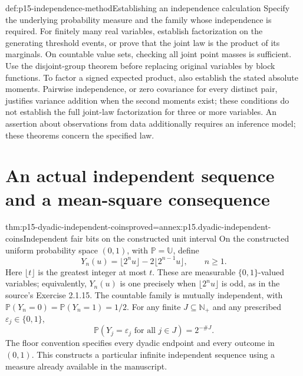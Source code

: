 \begin{hbmethod}{def:p15-independence-method}{Establishing an independence calculation}
Specify the underlying probability measure and the family whose
independence is required. For finitely many real variables, establish
factorization on the generating threshold events, or prove that the
joint law is the product of its marginals. On countable value sets,
checking all joint point masses is sufficient. Use the disjoint-group
theorem before replacing original variables by block functions. To factor
a signed expected product, also establish the stated absolute moments.
Pairwise independence, or zero covariance for every distinct pair,
justifies variance addition when the second moments exist; these
conditions do not establish the full joint-law factorization for three
or more variables. An assertion about observations from data additionally
requires an inference model; these theorems concern the specified law.
\end{hbmethod}

\section{An actual independent sequence and a mean-square consequence}
\label{sec:p15-independent-sequence}

\begin{hbtheorem}{thm:p15-dyadic-independent-coins}{proved=annex:p15.dyadic-independent-coins}{Independent fair bits on the constructed unit interval}
On the constructed uniform probability space \((0,1)\), with
\(\mathbb P=\mathbb U\), define
\[
 Y_n(u)=\lfloor2^nu\rfloor-2\lfloor2^{n-1}u\rfloor,
                      \qquad n\geq1.
\]
Here \(\lfloor t\rfloor\) is the greatest integer at most \(t\).
These are measurable \(\{0,1\}\)-valued variables; equivalently,
\(Y_n(u)\) is one precisely when \(\lfloor2^nu\rfloor\) is odd,
as in the source's Exercise 2.1.15. The countable family is mutually
independent, with \(\mathbb P(Y_n=0)=\mathbb P(Y_n=1)=1/2\).
For any finite \(J\subseteq\mathbb N_+\) and any prescribed
\(\varepsilon_j\in\{0,1\}\),
\[
 \mathbb P(Y_j=\varepsilon_j\text{ for all }j\in J)=2^{-\#J}.
\]
The floor convention specifies every dyadic endpoint and every outcome
in \((0,1)\). This constructs a particular infinite independent
sequence using a measure already available in the manuscript.
\end{hbtheorem}


